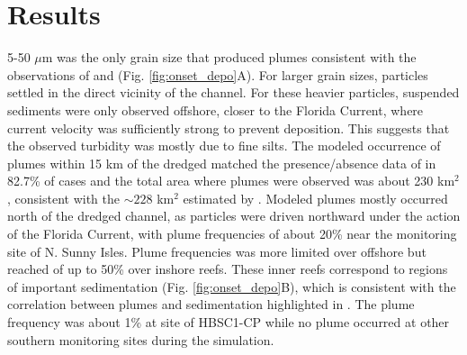\documentclass[preprint,12pt,authoryear]{elsarticle}
\begin{document}
\section{Results}

5-50 $\mu$m was the only grain size that produced plumes consistent with the observations of \cite{barnes2015sediment} and \cite{cunning2019extensive} (Fig. \ref{fig:onset_depo}A). For larger grain sizes, particles settled in the direct vicinity of the channel. For these heavier particles, suspended sediments were only observed offshore, closer to the Florida Current, where current velocity was sufficiently strong to prevent deposition. This suggests that the observed turbidity was mostly due to fine silts. The modeled occurrence of plumes within 15 km of the dredged matched the presence/absence data of \cite{cunning2019extensive} in 82.7\% of cases and the total area where plumes were observed was about 230 km$^2$, consistent with the $\sim228$ km$^2$ estimated by \cite{barnes2015sediment}. Modeled plumes mostly occurred north of the dredged channel, as particles were driven northward under the action of the Florida Current, with plume frequencies of about 20\% near the monitoring site of N. Sunny Isles. Plume frequencies was more limited over offshore but reached of up to 50\% over inshore reefs. These inner reefs correspond to regions of important sedimentation (Fig. \ref{fig:onset_depo}B), which is consistent with the correlation between plumes and sedimentation highlighted in \cite{cunning2019extensive}. The plume frequency was about 1\% at site of HBSC1-CP while no plume occurred at other southern monitoring sites during the simulation. 

\end{document}
